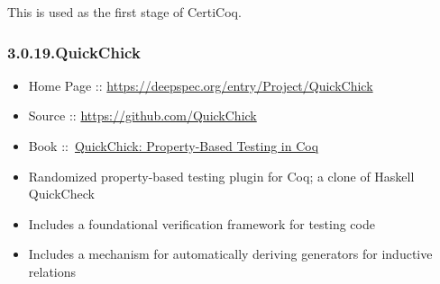 \documentclass[12pt,twoside]{article}
\begin{document}
This is used as the first stage of CertiCoq.%

\subsubsection{3.0.19.\hspace*{0.5em}QuickChick}\label{sec-quickchick}%

\begin{itemize}%

\item{}
Home Page :: \href{https://deepspec.org/entry/Project/QuickChick}{{\ttfamily https://\hspace{0pt}deepspec.\hspace{0pt}org/\hspace{0pt}entry/\hspace{0pt}Project/\hspace{0pt}QuickChick}}%

\item{}
Source :: \href{https://github.com/QuickChick}{{\ttfamily https://\hspace{0pt}github.\hspace{0pt}com/\hspace{0pt}QuickChick}}%

\item{}
Book ::~\href{https://softwarefoundations.cis.upenn.edu/qc-current}{QuickChick: Property-Based Testing in Coq}%

\item{}
Randomized property-based testing plugin for Coq; a clone of Haskell QuickCheck%

\item{}
Includes a foundational verification framework for testing code%

\item{}
Includes a mechanism for automatically deriving generators for inductive relations%
\end{itemize}%
\end{document}
